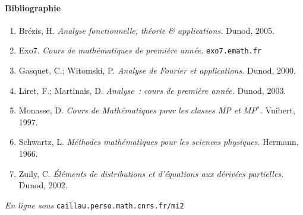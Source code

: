 \documentclass[11pt,a4paper]{article}
\theoremstyle{plain}
\theoremstyle{definition}
\begin{document}
\paragraph{Bibliographie}
\begin{enumerate}
\item Br\'ezis, H.
{\em Analyse fonctionnelle, th\'eorie \& applications.} Dunod, 2005.
\item Exo7.
{\em Cours de math\'ematiques de premi\`ere ann\'ee.} \verb+exo7.emath.fr+
\item Gasquet, C.;  Witomski, P.
{\em Analyse de Fourier et applications.} Dunod, 2000.
\item Liret, F.; Martinais, D.
{\em Analyse~: cours de premi\`ere ann\'ee.} Dunod, 2003.
\item Monasse, D.
{\em Cours de Math\'ematiques pour les classes MP et MP$^*$.} Vuibert, 1997.
\item Schwartz, L.
{\em M\'ethodes math\'ematiques pour les sciences physiques.} Hermann, 1966.
\item Zuily, C.
{\em \'El\'ements de distributions et d'\'equations aux d\'eriv\'ees partielles.}
Dunod, 2002.
\end{enumerate}

\vfill \begin{flushright}{\footnotesize \emph{En ligne sous}
\texttt{caillau.perso.math.cnrs.fr/mi2}} \end{flushright}
\end{document}
